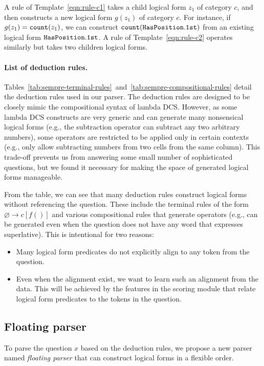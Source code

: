 A rule of Template~\ref{eqn:rule-c1}
takes a child logical form $z_1$ of category $c$,
and then constructs a new logical form $g(z_1)$ of category $c$.
For instance, if $g(z_1) = \texttt{count}(z_1)$,
we can construct
$\texttt{count}(\texttt{Has}{\texttt{Position}}.\texttt{1st})$
from an existing logical form $\texttt{Has}{\texttt{Position}}.\texttt{1st}$.
A rule of Template~\ref{eqn:rule-c2}
operates similarly but takes two children logical forms.



\paragraph{List of deduction rules.}
Tables~\ref{tab:sempre-terminal-rules}~and~\ref{tab:sempre-compositional-rules}
detail the deduction rules used in our parser.
The deduction rules are designed to be closely mimic
the compositional syntax of lambda DCS.
However, as some lambda DCS constructs are very generic
and can generate many nonsensical logical forms
(e.g., the subtraction operator can subtract
any two arbitrary numbers),
some operators are restricted to be applied
only in certain contexts
(e.g., only allow subtracting numbers from two cells
from the same column).
This trade-off prevents us from
answering some small number of sophisticated questions,
but we found it necessary for making the space
of generated logical forms manageable.

From the table,
we can see that many deduction rules
construct logical forms
without referencing the question.
These include the terminal rules of the form
$\varnothing \to c[f()]$
and various compositional rules
that generate operators
(e.g.,  can be generated even when
the question does not have any word that expresses superlative).
This is intentional for two reasons:
\begin{itemize}
\item Many logical form predicates do not explicitly align
to any token from the question.
\item Even when the alignment exist, we want to learn
such an alignment from the data.
This will be achieved by the features in the scoring module
that relate logical form predicates to the tokens in the question.
\end{itemize}

\subsection{Floating parser}\label{sec:floating-parser}
To parse the question $x$ based on the deduction rules,
we propose a new parser named \emph{floating parser}
that can construct logical forms in a flexible order.

